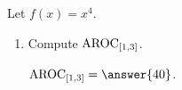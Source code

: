 \documentclass{ximera}
\author{Kenneth Berglund}
\begin{document}
\begin{exercise}

Let $f(x) = x^4$.

\begin{enumerate}
\item Compute $\mathrm{AROC}_{[1, 3]}$.

$\av_{[1, 3]} = \answer{40}$.  
	
\end{enumerate}

\end{exercise}
\end{document}
